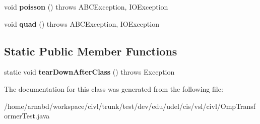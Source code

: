 \begin{DoxyCompactItemize}
\item 
\hypertarget{classedu_1_1udel_1_1cis_1_1vsl_1_1civl_1_1OmpTransformerTest_a3850939158ce28dc379f1b40f046a266}{}void {\bfseries poisson} ()  throws A\+B\+C\+Exception, I\+O\+Exception \label{classedu_1_1udel_1_1cis_1_1vsl_1_1civl_1_1OmpTransformerTest_a3850939158ce28dc379f1b40f046a266}

\item 
\hypertarget{classedu_1_1udel_1_1cis_1_1vsl_1_1civl_1_1OmpTransformerTest_a0a6472cbf207133cb229c9dc5f848382}{}void {\bfseries quad} ()  throws A\+B\+C\+Exception, I\+O\+Exception \label{classedu_1_1udel_1_1cis_1_1vsl_1_1civl_1_1OmpTransformerTest_a0a6472cbf207133cb229c9dc5f848382}

\end{DoxyCompactItemize}
\subsection*{Static Public Member Functions}
\begin{DoxyCompactItemize}
\item 
\hypertarget{classedu_1_1udel_1_1cis_1_1vsl_1_1civl_1_1OmpTransformerTest_aec7b224f0c6eb63a0725fcaf2aa92396}{}static void {\bfseries tear\+Down\+After\+Class} ()  throws Exception \label{classedu_1_1udel_1_1cis_1_1vsl_1_1civl_1_1OmpTransformerTest_aec7b224f0c6eb63a0725fcaf2aa92396}

\end{DoxyCompactItemize}


The documentation for this class was generated from the following file\+:\begin{DoxyCompactItemize}
\item 
/home/arnabd/workspace/civl/trunk/test/dev/edu/udel/cis/vsl/civl/Omp\+Transformer\+Test.\+java\end{DoxyCompactItemize}

